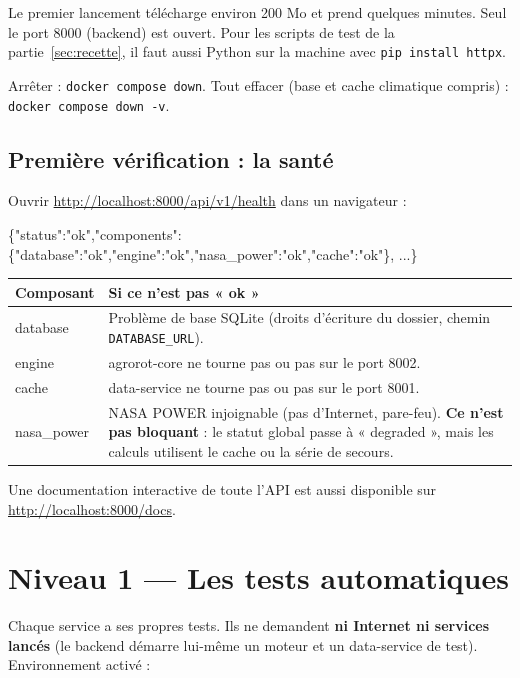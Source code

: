 \documentclass[11pt,a4paper]{article}
\begin{document}
Le premier lancement télécharge environ 200 Mo et prend quelques minutes. Seul le port 8000 (backend) est ouvert.
Pour les scripts de test de la partie~\ref{sec:recette}, il faut aussi Python sur la machine avec
\texttt{pip install httpx}.

Arrêter : \texttt{docker compose down}. Tout effacer (base et cache climatique compris) : \texttt{docker compose down -v}.

\subsection{Première vérification : la santé}

Ouvrir \url{http://localhost:8000/api/v1/health} dans un navigateur :
\begin{code}
\{"status":"ok","components":\{"database":"ok","engine":"ok","nasa_power":"ok","cache":"ok"\}, ...\}
\end{code}

\begin{center}
\begin{tabularx}{\textwidth}{L{3cm}Y}
\toprule
\textbf{Composant} & \textbf{Si ce n'est pas « ok »} \\
\midrule
database & Problème de base SQLite (droits d'écriture du dossier, chemin \texttt{DATABASE\_URL}). \\
engine & agrorot-core ne tourne pas ou pas sur le port 8002. \\
cache & data-service ne tourne pas ou pas sur le port 8001. \\
nasa\_power & NASA POWER injoignable (pas d'Internet, pare-feu). \textbf{Ce n'est pas bloquant} : le statut global passe à « degraded », mais les calculs utilisent le cache ou la série de secours. \\
\bottomrule
\end{tabularx}
\end{center}

Une documentation interactive de toute l'API est aussi disponible sur \url{http://localhost:8000/docs}.

\section{Niveau 1 — Les tests automatiques}

Chaque service a ses propres tests. Ils ne demandent \textbf{ni Internet ni services lancés} (le backend démarre
lui-même un moteur et un data-service de test). Environnement activé :
\end{document}

